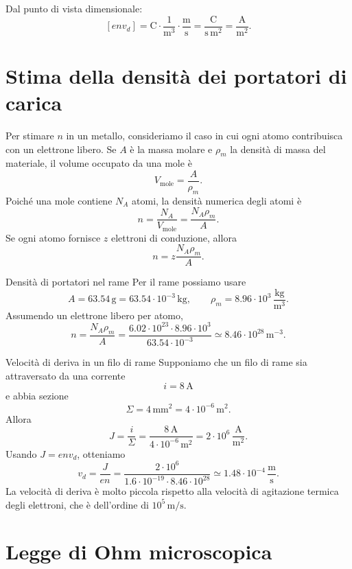 \documentclass[a4paper]{article}
\begin{document}
Dal punto di vista dimensionale:
\[
    [en v_d]=\mathrm{C}\cdot\frac{1}{\mathrm{m}^3}\cdot\frac{\mathrm{m}}{\mathrm{s}}
    =\frac{\mathrm{C}}{\mathrm{s}\,\mathrm{m}^2}
    =\frac{\mathrm{A}}{\mathrm{m}^2}.
\]

\section{Stima della densità dei portatori di carica}

Per stimare \(n\) in un metallo, consideriamo il caso in cui ogni atomo contribuisca con un elettrone libero. Se \(A\) è la massa molare e \(\rho_m\) la densità di massa del materiale, il volume occupato da una mole è
\[
    V_{\mathrm{mole}}=\frac{A}{\rho_m}.
\]
Poiché una mole contiene \(N_A\) atomi, la densità numerica degli atomi è
\[
    n=\frac{N_A}{V_{\mathrm{mole}}}=\frac{N_A\rho_m}{A}.
\]
Se ogni atomo fornisce \(z\) elettroni di conduzione, allora
\[
    n=z\frac{N_A\rho_m}{A}.
\]

\begin{snippetexample}{Densità di portatori nel rame}
    Per il rame possiamo usare
    \[
        A=63.54\,\mathrm{g}=63.54\cdot 10^{-3}\,\mathrm{kg},
        \qquad
        \rho_m=8.96\cdot 10^3\,\frac{\mathrm{kg}}{\mathrm{m}^3}.
    \]
    Assumendo un elettrone libero per atomo,
    \[
        n=\frac{N_A\rho_m}{A}
        =\frac{6.02\cdot 10^{23}\cdot 8.96\cdot 10^3}{63.54\cdot 10^{-3}}
        \simeq 8.46\cdot 10^{28}\,\mathrm{m}^{-3}.
    \]
\end{snippetexample}

\begin{snippetexample}{Velocità di deriva in un filo di rame}
    Supponiamo che un filo di rame sia attraversato da una corrente
    \[
        i=8\,\mathrm{A}
    \]
    e abbia sezione
    \[
        \Sigma=4\,\mathrm{mm}^2=4\cdot 10^{-6}\,\mathrm{m}^2.
    \]
    Allora
    \[
        J=\frac{i}{\Sigma}=\frac{8\,\mathrm{A}}{4\cdot 10^{-6}\,\mathrm{m}^2}
        =2\cdot 10^6\,\frac{\mathrm{A}}{\mathrm{m}^2}.
    \]
    Usando \(J=en v_d\), otteniamo
    \[
        v_d=\frac{J}{en}
        =\frac{2\cdot 10^6}{1.6\cdot 10^{-19}\cdot 8.46\cdot 10^{28}}
        \simeq 1.48\cdot 10^{-4}\,\frac{\mathrm{m}}{\mathrm{s}}.
    \]
    La velocità di deriva è molto piccola rispetto alla velocità di agitazione termica degli elettroni, che è dell'ordine di \(10^5\,\mathrm{m/s}\).
\end{snippetexample}

\section{Legge di Ohm microscopica}
\end{document}
